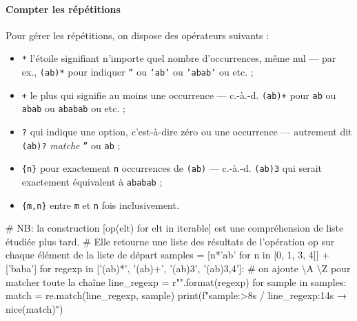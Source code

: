 \vspace{1pt}%

\paragraph{Compter les répétitions}
Pour gérer les répétitions, on dispose des opérateurs suivants :
\begin{itemize}
\item \texttt{*} l'étoile signifiant n'importe quel nombre d'occurrences, même nul --- par ex., \texttt{(ab)*} pour indiquer \texttt{''} ou \texttt{'ab'} ou \texttt{'abab'} ou etc. ;
\item \texttt{+} le plus qui signifie au moins une occurrence --- c.-à.-d. \texttt{(ab)+} pour \texttt{ab} ou \texttt{abab} ou \texttt{ababab} ou etc. ;
\item \texttt{?} qui indique une option, c'est-à-dire zéro ou une occurrence --- autrement dit \texttt{(ab)?} \textit{matche} \texttt{''} ou \texttt{ab} ;
\item \texttt{\{n\}} pour exactement \texttt{n} occurrences de \texttt{(ab)} --- c.-à.-d. \texttt{(ab){3}} qui serait exactement équivalent à \texttt{ababab} ;
\item \texttt{\{m,n\}} entre \texttt{m} et \texttt{n} fois inclusivement.
\end{itemize}

\begin{idleconsole*}
	\begin{pyconsole}
# NB: la construction [op(elt) for elt in iterable] est une compréhension de liste étudiée plus tard.
# Elle retourne une liste des résultats de l'opération op sur chaque élément de la liste de départ
samples = [n*'ab' for n in [0, 1, 3, 4]] + ['baba']
for regexp in ['(ab)*', '(ab)+', '(ab){3}', '(ab){3,4}']:
    # on ajoute \textbackslash{A} \textbackslash{Z} pour matcher toute la chaîne
    line_regexp = r"\A{}\Z".format(regexp)
    for sample in samples:
        match = re.match(line_regexp, sample)
        print(f"{sample:>8s} / {line_regexp:14s} → {nice(match)}")

\end{pyconsole}
\end{idleconsole*}

\vspace{1pt}

